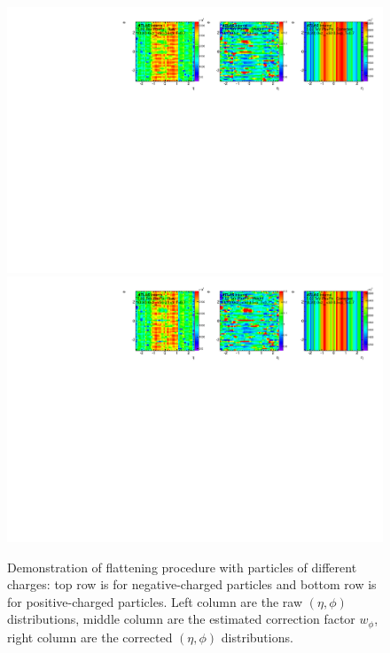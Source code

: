 \begin{figure}[H]
\centering
\includegraphics[width=.9\linewidth]{figs/sec_ana/cumuFlat_Cent0_Zvtx5_Chg0_Pt1.pdf}
\includegraphics[width=.9\linewidth]{figs/sec_ana/cumuFlat_Cent0_Zvtx5_Chg1_Pt1.pdf}
\caption{Demonstration of flattening procedure with particles of different charges: top row is for negative-charged particles and bottom row is for positive-charged particles. Left column are the raw $(\eta,\phi)$ distributions, middle column are the estimated correction factor $w_{\phi}$, right column are the corrected $(\eta,\phi)$ distributions.}
\label{fig:cumuAna_FLAT_Chg}
\end{figure}


